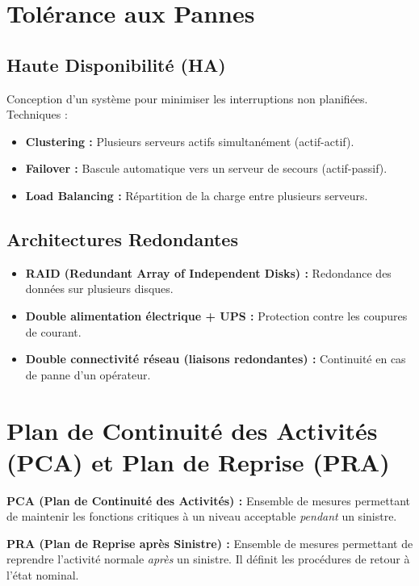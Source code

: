 \section{Tolérance aux Pannes}

\subsection{Haute Disponibilité (HA)}
Conception d'un système pour minimiser les interruptions non planifiées. Techniques :
\begin{itemize}
    \item \textbf{Clustering :} Plusieurs serveurs actifs simultanément (actif-actif).
    \item \textbf{Failover :} Bascule automatique vers un serveur de secours (actif-passif).
    \item \textbf{Load Balancing :} Répartition de la charge entre plusieurs serveurs.
\end{itemize}

\subsection{Architectures Redondantes}
\begin{itemize}
    \item \textbf{RAID (Redundant Array of Independent Disks) :} Redondance des données sur plusieurs disques.
    \item \textbf{Double alimentation électrique + UPS :} Protection contre les coupures de courant.
    \item \textbf{Double connectivité réseau (liaisons redondantes) :} Continuité en cas de panne d'un opérateur.
\end{itemize}

\section{Plan de Continuité des Activités (PCA) et Plan de Reprise (PRA)}

\begin{boxdef}
\textbf{PCA (Plan de Continuité des Activités) :} Ensemble de mesures permettant de maintenir les fonctions critiques à un niveau acceptable \textit{pendant} un sinistre.

\textbf{PRA (Plan de Reprise après Sinistre) :} Ensemble de mesures permettant de reprendre l'activité normale \textit{après} un sinistre. Il définit les procédures de retour à l'état nominal.
\end{boxdef}

